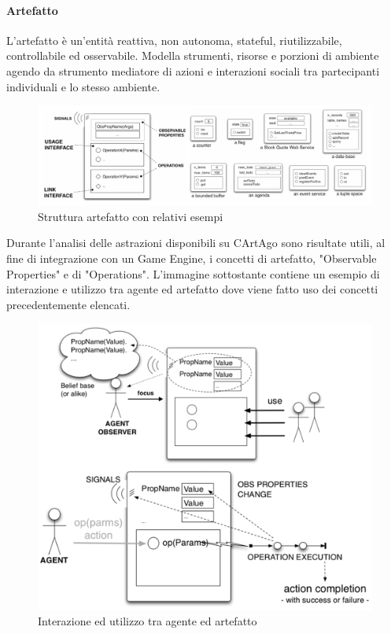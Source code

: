 \smallskip

\paragraph{Artefatto}
L'artefatto è un'entità reattiva, non autonoma, stateful, riutilizzabile, controllabile ed osservabile. Modella strumenti, risorse e porzioni di ambiente agendo da strumento mediatore di azioni e interazioni sociali tra partecipanti individuali e lo stesso ambiente.\cite{Omicini2008} 

\begin{figure}[H]
\centering
\includegraphics[width=\linewidth]{figures/Artifact_structure_example.png}
\caption{Struttura artefatto con relativi esempi}
\end{figure}

Durante l'analisi delle astrazioni disponibili su CArtAgo sono risultate utili, al fine di integrazione con un Game Engine, i concetti di artefatto, "Observable Properties" e di "Operations". L'immagine sottostante contiene un esempio di interazione e utilizzo tra agente ed artefatto dove viene fatto uso dei concetti precedentemente elencati.

\begin{figure}[H]
\centering
\includegraphics[width=\linewidth]{figures/Artifact_use.png}
\caption{Interazione ed utilizzo tra agente ed artefatto}
\end{figure}

